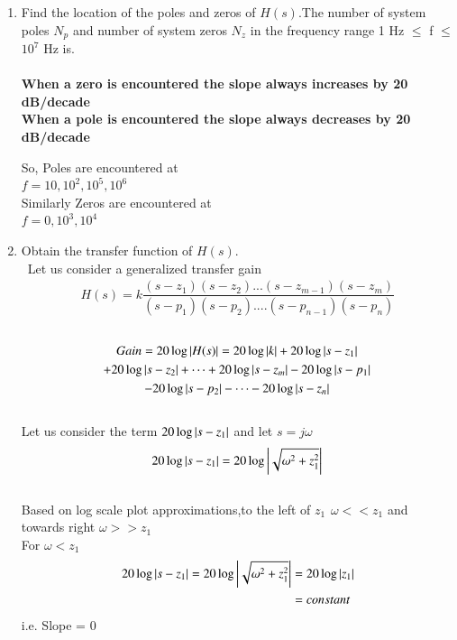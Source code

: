 \begin{enumerate}[label=\thesection.\arabic*.,ref=\thesection.\theenumi]

\item Find the location of the poles and zeros of $H(s).$The number of system poles $N_{p}$ and number of system zeros $N_{z}$ in the frequency range 1 Hz $\leq$ f $\leq$ $10^{7}$ Hz is.
\\
\solution\\
\textbf{When a zero is encountered the slope always increases by 20 dB/decade}\\
\textbf{When a pole is encountered the slope always decreases by 20 dB/decade}

So, Poles are encountered at\\ $f = 10,10^2,10^5,10^6$\\
Similarly Zeros are encountered at\\ $f = 0,10^3,10^4$


\item Obtain the transfer function of $H(s)$.
\\
\solution\
Let us consider a generalized transfer gain\\
\begin{align}
	H(s) = k \dfrac{(s-z_{1})(s-z_{2})...(s-z_{m-1})(s-z_{m})}{(s-p_{1})(s-p_{2})....(s-p_{n-1})(s-p_{n})}
\end{align}\\
\begin{multline}
	Gain = 20\log\left\vert H(s)\right\vert = 20\log \left\vert k\right\vert + 20\log \left\vert s-z_{1}\right\vert 
	    \\
	    + 20\log \left\vert s-z_{2}\right\vert + \dots + 20\log \left\vert s-z_{m}\right\vert - 20\log \left\vert s-p_{1}\right\vert 
	    \\
	    - 20\log \left\vert s-p_{2}\right\vert - \dots - 20\log \left\vert s-z_{n}\right\vert 
\end{multline}\\

Let us consider the term $ 20\log \left\vert s-z_{1}\right\vert $ and let $s = j\omega$\\
\begin{align}
	20\log \left\vert s-z_{1}\right\vert = 20\log \left\vert\sqrt{\omega^{2} + z_{1}^{2}}\right\vert
\end{align}\\

Based on log scale plot approximations,to the left of $z_{1} \hspace{5pt} \omega << z_{1}$ and towards right  $\omega >> z_{1}$\\
For $\omega < z_{1}$\\
\begin{align}
	20\log \left\vert s-z_{1}\right\vert = 20\log \left\vert\sqrt{\omega^{2} + z_{1}^{2}}\right\vert
	&= 20 \log \left\vert z_{1}\right\vert\\
	&= constant
\end{align}  
i.e. Slope = 0\\


\end{enumerate}
